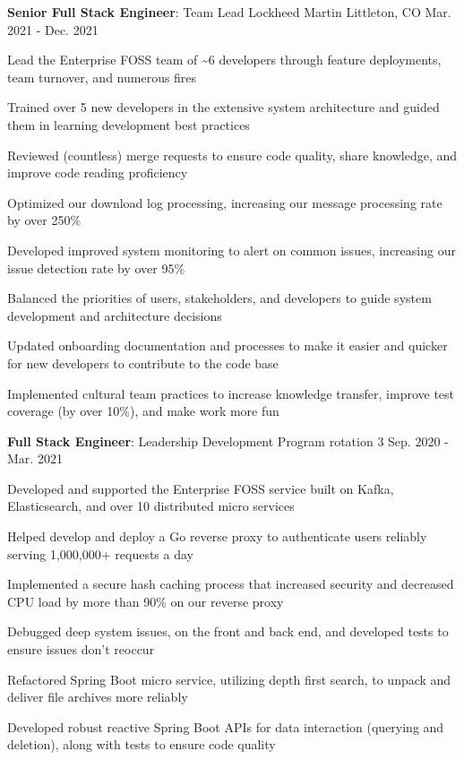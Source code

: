 \begin{cventries}
\vspace{-1.25em}
\cventry
{\textbf{Senior Full Stack Engineer}: Team Lead} %
{Lockheed Martin} %
{Littleton, CO} %
{Mar. 2021 - Dec. 2021} %
{ %
\begin{cvitems}
    \item {Lead the Enterprise FOSS team of \textasciitilde{6} developers through feature deployments, team turnover, and numerous fires}
    \item {Trained over 5 new developers in the extensive system architecture and guided them in learning development best practices}
    \item {Reviewed (countless) merge requests to ensure code quality, share knowledge, and improve code reading proficiency}
    \item {Optimized our download log processing, increasing our message processing rate by over 250\%}
    \item {Developed improved system monitoring to alert on common issues, increasing our issue detection rate by over 95\%}
    \item {Balanced the priorities of users, stakeholders, and developers to guide system development and architecture decisions}
    \item {Updated onboarding documentation and processes to make it easier and quicker for new developers to contribute to the code base}
    \item {Implemented cultural team practices to increase knowledge transfer, improve test coverage (by over 10\%), and make work more fun}
\end{cvitems}
}

\vspace{-1.25em}
\cventry
{\textbf{Full Stack Engineer}: Leadership Development Program rotation 3} %
{} %
{} %
{Sep. 2020 - Mar. 2021} %
{ %
\begin{cvitems}
\item {Developed and supported the Enterprise FOSS service built on Kafka, Elasticsearch, and over 10 distributed micro services}
\item {Helped develop and deploy a Go reverse proxy to authenticate users reliably serving 1,000,000+ requests a day}
\item {Implemented a secure hash caching process that increased security and decreased CPU load by more than 90\% on our reverse proxy}
\item {Debugged deep system issues, on the front and back end, and developed tests to ensure issues don't reoccur}
\item {Refactored Spring Boot micro service, utilizing depth first search, to unpack and deliver file archives more reliably}
\item {Developed robust reactive Spring Boot APIs for data interaction (querying and deletion), along with tests to ensure code quality}
\end{cvitems}
}


\end{cventries}
